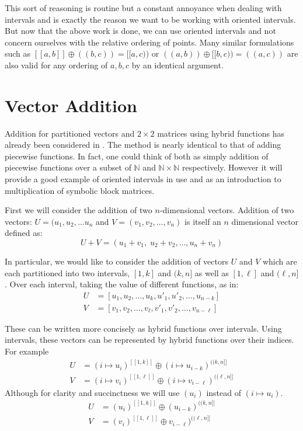 This sort of reasoning is routine but a constant annoyance when dealing with intervals 
and is exactly the reason we want to be working with oriented intervals.
But now that the above work is done, we can use oriented intervals 
and not concern ourselves with the relative ordering of points.
Many similar formulations such as $[\![ a,b ]\!] \oplus (\!( b,c )\!) = [\![a,c)\!)$ or $(\!(a,b)\!) \oplus [\![b,c)\!) = (\!(a,c)\!)$ 
are also valid for any ordering of $a,b,c$ by an identical argument. 



%
%

\section{Vector Addition}
Addition for partitioned vectors and $2 \times 2$ matrices using hybrid functions has already been considered in \cite{sexton2008abstract, carette2010}.
The method is nearly identical to that of adding piecewise functions.
In fact, one could think of both as simply addition of piecewise functions over a subset of 
$\mathbb{N}$ and $\mathbb{N} \times \mathbb{N}$ respectively.
However it will provide a good example of oriented intervals in use and as an introduction to multiplication of 
symbolic block matrices.


First we will consider the addition of two $n$-dimensional vectors.
Addition of two vectors: $U= (u_1, u_2, \ldots u_n$ and $V = (v_1, v_2, \ldots, v_n)$ is itself an $n$ dimensional vector 
defined as:
\begin{equation}
	U+V = (u_1+v_1, \; u_2+v_2, \ldots, u_n+v_n)
\end{equation}


In particular, we would like to consider the addition of vectors $U$ and $V$ which are each partitioned into two intervals,
$[1,k]$ and $(k,n]$ as well as $[1,\ell]$ and $(\ell, n]$.
Over each interval, taking the value of different functions, as in:
\begin{align}
	U &= [ u_1, u_2, \ldots, u_{k}, u'_1, u'_2, \ldots, u_{n-k} ] \\
	V &= [ v_1, v_2, \ldots, v_{\ell}, v'_1, v'_2, \ldots, v_{n-\ell} ]
\end{align}


These can be written more concisely as hybrid functions over intervals. 
Using intervals, these vectors can be represented by hybrid functions over their indices.
For example
\begin{align}
	U &= (i \mapsto u_i)^{[\![1, k]\!]} \oplus (i \mapsto u_{i-k})^{(\!(k,n]\!]} \\
	V &= (i \mapsto v_i)^{[\![1, \ell]\!]} \oplus (i \mapsto v_{i-\ell})^{(\!(\ell,n]\!]}
\end{align}
Although for clarity and succinctness we will use $(u_i)$ instead of $(i \mapsto u_i)$.
\begin{align}
	U &= (u_i)^{[\![1, k]\!]} \oplus (u_{i-k})^{(\!(k,n]\!]} \\
	V &= (v_i)^{[\![1, \ell]\!]} \oplus v_{i-\ell})^{(\!(\ell,n]\!]}
\end{align}


